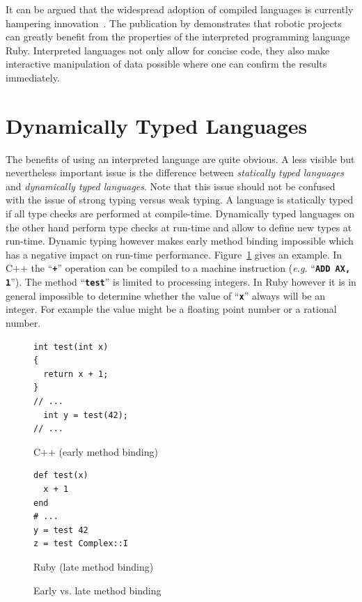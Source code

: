 \documentclass[12pt,a4paper,oneside,openright]{book}
\newcommand{\eg}{\emph{e.g.} }
\newcommand{\Eg}{For example }
\newcommand{\fig}[1]{Figure~\ref{fig:#1}}
\newcommand{\code}[1]{``\texttt{\textbf{\textcolor{codegray}{\small{#1}}}}''}
\begin{document}
\begin{CJK}{UTF8}{}
It can be argued that the widespread adoption of compiled languages is currently hampering innovation~\citep{RefWorks:311}. The publication by \citet{RefWorks:480} demonstrates that robotic projects can greatly benefit from the properties of the interpreted programming language Ruby. Interpreted languages not only allow for concise code, they also make interactive manipulation of data possible where one can confirm the results immediately.

\section{Dynamically Typed Languages}\label{cha:dyntyped}
The benefits of using an interpreted language are quite obvious. A less visible but nevertheless important issue is the difference between \emph{statically typed languages} and \emph{dynamically typed languages}. Note that this issue should not be confused with the issue of strong typing versus weak typing. A language is statically typed if all type checks are performed at compile-time. Dynamically typed languages on the other hand perform type checks at run-time and allow to define new types at run-time. Dynamic typing however makes early method binding impossible which has a negative impact on run-time performance. \fig{binding} gives an example. In C++ the \code{+} operation can be compiled to a machine instruction (\eg \code{ADD AX, 1}). The method \code{test} is limited to processing integers. In Ruby however it is in general impossible to determine whether the value of \code{x} always will be an integer. \Eg the value might be a floating point number or a rational number.
\begin{figure}[htbp]
  \begin{center}
    \begin{minipage}[b]{.4\textwidth}
      \begin{center}
        \lstset{language=C++,frame=single,numbers=none}
        \begin{lstlisting}
int test(int x)
{
  return x + 1;
}
// ...
  int y = test(42);
// ...
        \end{lstlisting}
        C++ (early method binding)
      \end{center}
    \end{minipage}\hspace{3ex}
    \begin{minipage}[b]{.4\textwidth}
      \begin{center}
        \lstset{language=Ruby,frame=single,numbers=none}
        \begin{lstlisting}
def test(x)
  x + 1
end
# ...
y = test 42
z = test Complex::I
        \end{lstlisting}
        Ruby (late method binding)
      \end{center}
    \end{minipage}
  \end{center}
  \caption{Early vs. late method binding\label{fig:binding}}
\end{figure}


\end{CJK}
\end{document}
